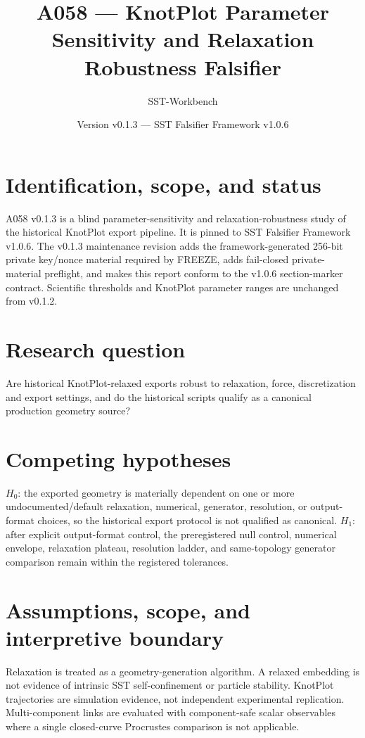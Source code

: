 \documentclass[11pt,a4paper]{article}
\title{A058 --- KnotPlot Parameter Sensitivity and Relaxation Robustness Falsifier}
\author{SST-Workbench}\date{Version v0.1.3 --- SST Falsifier Framework v1.0.6}
\begin{document}
\maketitle\sloppy
\section{Identification, scope, and status}
A058 v0.1.3 is a blind parameter-sensitivity and relaxation-robustness study of the historical KnotPlot export pipeline. It is pinned to SST Falsifier Framework v1.0.6. The v0.1.3 maintenance revision adds the framework-generated 256-bit private key/nonce material required by FREEZE, adds fail-closed private-material preflight, and makes this report conform to the v1.0.6 section-marker contract. Scientific thresholds and KnotPlot parameter ranges are unchanged from v0.1.2.
\section{Research question}
Are historical KnotPlot-relaxed exports robust to relaxation, force, discretization and export settings, and do the historical scripts qualify as a canonical production geometry source?
\section{Competing hypotheses}
$H_0$: the exported geometry is materially dependent on one or more undocumented/default relaxation, numerical, generator, resolution, or output-format choices, so the historical export protocol is not qualified as canonical. $H_1$: after explicit output-format control, the preregistered null control, numerical envelope, relaxation plateau, resolution ladder, and same-topology generator comparison remain within the registered tolerances.
\section{Assumptions, scope, and interpretive boundary}
Relaxation is treated as a geometry-generation algorithm. A relaxed embedding is not evidence of intrinsic SST self-confinement or particle stability. KnotPlot trajectories are simulation evidence, not independent experimental replication. Multi-component links are evaluated with component-safe scalar observables where a single closed-curve Procrustes comparison is not applicable.
\end{document}
